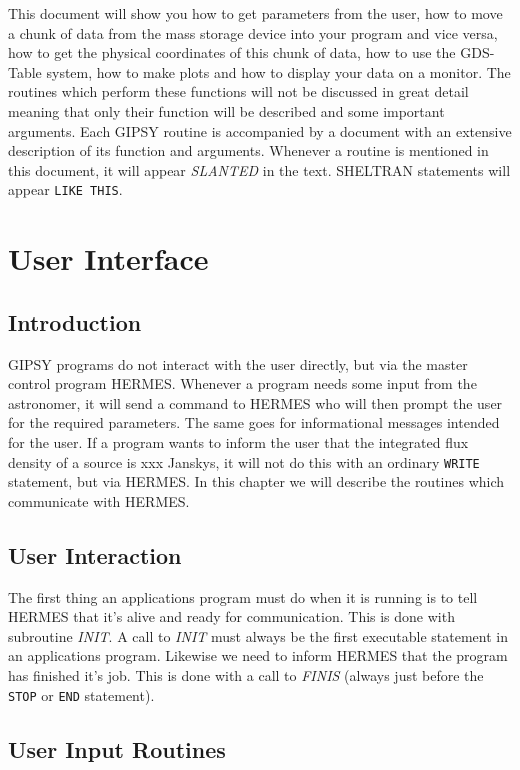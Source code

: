 This document will show you how to get parameters from the user, how to
move a chunk of data from the mass storage device into your program and
vice versa, how to get the physical coordinates of this chunk of data,
how to use the GDS-Table system, how to make plots and how to display
your data on a monitor.  The routines which perform these functions will
not be discussed in great detail meaning that only their function will
be described and some important arguments.  Each GIPSY routine is
accompanied by a document with an extensive description of its function
and arguments.  Whenever a routine is mentioned in this document, it
will appear {\sl SLANTED\/} in the text.  SHELTRAN statements will
appear {\tt LIKE THIS}.

\chapter{User Interface}

\section{Introduction}

GIPSY programs do not interact with the user directly, but via the
master control program HERMES.  Whenever a program needs some input from
the astronomer, it will send a command to HERMES who will then prompt
the user for the required parameters.  The same goes for informational
messages intended for the user.  If a program wants to inform the user
that the integrated flux density of a source is xxx Janskys, it will not
do this with an ordinary {\tt WRITE} statement, but via HERMES.  In this
chapter we will describe the routines which communicate with HERMES.

\section{User Interaction}

The first thing an applications program must do when it is running is to
tell HERMES that it's alive and ready for communication.  This is done
with subroutine {\sl INIT\/}.  A call to {\sl INIT\/} must
always be the first executable statement in an applications program.
Likewise we need to inform HERMES that the program has finished it's
job.  This is done with a call to {\sl FINIS\/} (always just before the
{\tt STOP} or {\tt END} statement).

\section{User Input Routines}

